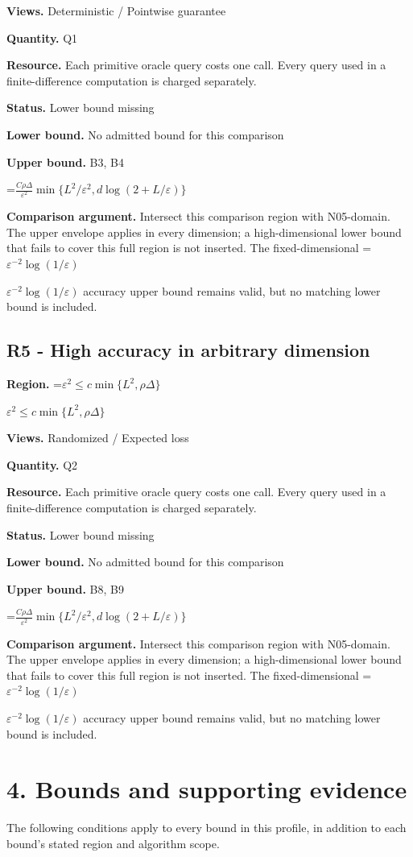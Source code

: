 \documentclass[10pt,a4paper]{article}
\newcommand{\AtlasMath}[1]{\par\begingroup\centering\setbox0=\hbox{$\displaystyle #1$}\ifdim\wd0>1.4\linewidth\typeout{ATLAS WIDE FORMULA: \the\wd0}\fi\ifdim\wd0>\linewidth\resizebox{\linewidth}{!}{\box0}\else\box0\fi\par\endgroup}
\newcommand{\AtlasInlineMath}[1]{\begingroup\setbox0=\hbox{$#1$}\ifdim\wd0>.4\linewidth\endgroup\AtlasMath{#1}\else\endgroup$#1$\fi}
\begin{document}
\textbf{Views.} Deterministic / Pointwise guarantee

\textbf{Quantity.} Q1

\textbf{Resource.} Each primitive oracle query costs one call. Every query used in a finite-difference computation is charged separately.

\textbf{Status.} Lower bound missing

\textbf{Lower bound.} No admitted bound for this comparison

\textbf{Upper bound.} B3, B4

\AtlasMath{\frac{C\rho\Delta}{\varepsilon^2}\min\{L^2/\varepsilon^2,d\log(2+L/\varepsilon)\}}
\textbf{Comparison argument.} Intersect this comparison region with N05-domain. The upper envelope applies in every dimension; a high-dimensional lower bound that fails to cover this full region is not inserted. The fixed-dimensional \AtlasInlineMath{\varepsilon^{-2}\log(1/\varepsilon)} accuracy upper bound remains valid, but no matching lower bound is included.

\subsection{R5 - High accuracy in arbitrary dimension}
\textbf{Region.} \AtlasInlineMath{\varepsilon^2\le c\min\{L^2,\rho\Delta\}}

\textbf{Views.} Randomized / Expected loss

\textbf{Quantity.} Q2

\textbf{Resource.} Each primitive oracle query costs one call. Every query used in a finite-difference computation is charged separately.

\textbf{Status.} Lower bound missing

\textbf{Lower bound.} No admitted bound for this comparison

\textbf{Upper bound.} B8, B9

\AtlasMath{\frac{C\rho\Delta}{\varepsilon^2}\min\{L^2/\varepsilon^2,d\log(2+L/\varepsilon)\}}
\textbf{Comparison argument.} Intersect this comparison region with N05-domain. The upper envelope applies in every dimension; a high-dimensional lower bound that fails to cover this full region is not inserted. The fixed-dimensional \AtlasInlineMath{\varepsilon^{-2}\log(1/\varepsilon)} accuracy upper bound remains valid, but no matching lower bound is included.

\section{4. Bounds and supporting evidence}
The following conditions apply to every bound in this profile, in addition to each bound's stated region and algorithm scope.
\end{document}
